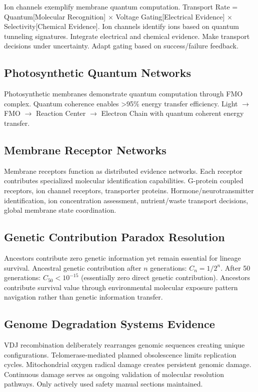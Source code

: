 \documentclass[12pt,a4paper]{article}
\begin{document}
Ion channels exemplify membrane quantum computation. Transport Rate = Quantum[Molecular Recognition] $\times$ Voltage Gating[Electrical Evidence] $\times$ Selectivity[Chemical Evidence]. Ion channels identify ions based on quantum tunneling signatures. Integrate electrical and chemical evidence. Make transport decisions under uncertainty. Adapt gating based on success/failure feedback.

\subsection{Photosynthetic Quantum Networks}

Photosynthetic membranes demonstrate quantum computation through FMO complex. Quantum coherence enables >95\% energy transfer efficiency. Light $\to$ FMO $\to$ Reaction Center $\to$ Electron Chain with quantum coherent energy transfer.

\subsection{Membrane Receptor Networks}

Membrane receptors function as distributed evidence networks. Each receptor contributes specialized molecular identification capabilities. G-protein coupled receptors, ion channel receptors, transporter proteins. Hormone/neurotransmitter identification, ion concentration assessment, nutrient/waste transport decisions, global membrane state coordination.

\subsection{Genetic Contribution Paradox Resolution}

Ancestors contribute zero genetic information yet remain essential for lineage survival. Ancestral genetic contribution after $n$ generations: $C_n = 1/2^n$. After 50 generations: $C_{50} < 10^{-15}$ (essentially zero direct genetic contribution). Ancestors contribute survival value through environmental molecular exposure pattern navigation rather than genetic information transfer.

\subsection{Genome Degradation Systems Evidence}

VDJ recombination deliberately rearranges genomic sequences creating unique configurations. Telomerase-mediated planned obsolescence limits replication cycles. Mitochondrial oxygen radical damage creates persistent genomic damage. Continuous damage serves as ongoing validation of molecular resolution pathways. Only actively used safety manual sections maintained.
\end{document}

